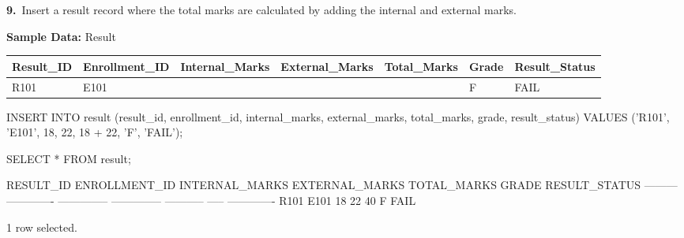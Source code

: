 \noindent\begin{minipage}{\linewidth}
\begingroup{}
{\fontsize{14}{17}\selectfont\textbf{9.}}\ Insert a result record where the total marks are calculated by adding the internal and external marks.\par
\endgroup\vspace{12pt}

\noindent\textbf{Sample Data:} Result\par
\vspace{6pt}
{\footnotesize\setlength{\tabcolsep}{4pt}
\renewcommand{\arraystretch}{1.25}
\noindent\begin{tabular}{|>{\raggedright\arraybackslash}p{51.3pt}|>{\raggedright\arraybackslash}p{72.8pt}|>{\raggedleft\arraybackslash}p{76.3pt}|>{\raggedleft\arraybackslash}p{78.5pt}|>{\raggedleft\arraybackslash}p{63.1pt}|>{\raggedright\arraybackslash}p{35.2pt}|>{\raggedright\arraybackslash}p{66.8pt}|}
\hline
\textbf{Result\_ID} & \textbf{Enrollment\_ID} & \textbf{Internal\_Marks} & \textbf{External\_Marks} & \textbf{Total\_Marks} & \textbf{Grade} & \textbf{Result\_Status} \\ \hline
R101 & E101 & 18 & 22 & 40 & F & FAIL \\ \hline
\end{tabular}\par}
\vspace{14pt}

\begin{sqlcode}
INSERT INTO result (result_id, enrollment_id, internal_marks, external_marks,
                    total_marks, grade, result_status)
VALUES ('R101', 'E101', 18, 22, 18 + 22, 'F', 'FAIL');

SELECT * FROM result;
\end{sqlcode}

\vspace{18pt}


\begin{sqlout}[fontsize=\footnotesize]
RESULT_ID  ENROLLMENT_ID  INTERNAL_MARKS  EXTERNAL_MARKS  TOTAL_MARKS  GRADE  RESULT_STATUS
---------  -------------  --------------  --------------  -----------  -----  -------------
R101       E101                       18              22           40  F      FAIL

1 row selected.
\end{sqlout}
\end{minipage}\par\vspace{24pt}

